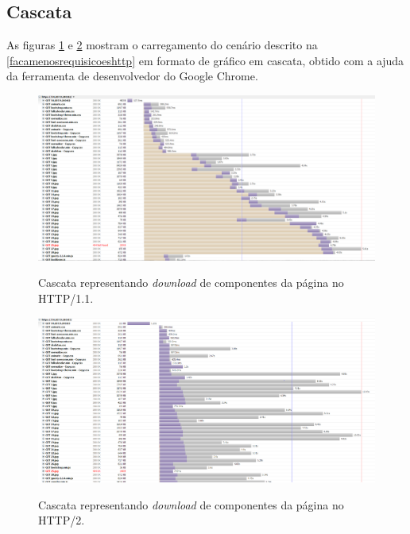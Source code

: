 \subsection{Cascata}
\label{cascata}

As figuras \ref{fig:cascatahttp11} e \ref{fig:cascatahttp2} mostram o carregamento do cenário descrito na \autoref{facamenosrequisicoeshttp} em formato de gráfico em cascata, obtido com a ajuda da ferramenta de desenvolvedor do Google Chrome.

\begin{landscape}
	\begin{figure}[!htbp]
    	\centering
	    \caption{Cascata representando \textit{download} de componentes da página no HTTP/1.1.}
    	\includegraphics[width=1.5\textwidth]{./04-figuras/analise-de-resultados/cascata_http11}
	    \label{fig:cascatahttp11}
	\end{figure}
\end{landscape}

\begin{landscape}
	\begin{figure}[!htbp]
    	\centering
	    \caption{Cascata representando \textit{download} de componentes da página no HTTP/2.}
    	\includegraphics[width=1.5\textwidth]{./04-figuras/analise-de-resultados/cascata_http2}
	    \label{fig:cascatahttp2}
	\end{figure}
\end{landscape}

